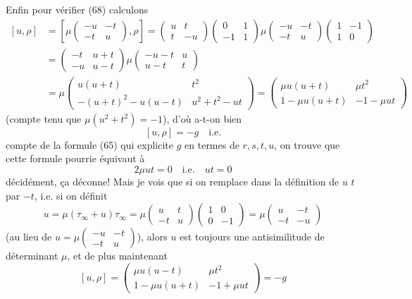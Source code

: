 \begin{enumerate}
Enfin pour vérifier (68) calculons
$$
\begin{aligned}
[u, \rho] &= \left[ \mu \begin{pmatrix} -u & -t \\ -t & u \end{pmatrix} , \rho \right] = \begin{pmatrix} u & t \\ t & -u \end{pmatrix} \begin{pmatrix} 0 & 1 \\ -1 & 1 \end{pmatrix} \mu \begin{pmatrix} -u & -t \\ -t & u \end{pmatrix} \begin{pmatrix} 1 & -1 \\ 1 & 0 \end{pmatrix} \\
&= \begin{pmatrix} -t & u+t \\ -u & u-t \end{pmatrix} \mu \begin{pmatrix} -u-t & u \\ u-t & t \end{pmatrix} \\
&= \mu \begin{pmatrix} u(u+t) & t^2 \\ -(u+t)^2 - u(u-t) & u^2+t^2-ut \end{pmatrix} = \begin{pmatrix} \mu u(u+t) & \mu t^2 \\ 1-\mu u(u+t) & -1-\mu ut \end{pmatrix}
\end{aligned}
$$
(compte tenu que $\mu(u^2+t^2) = -1$), d'où a-t-on bien
$$ [u, \rho] = -g \quad \text{i.e.} $$
compte de la formule (65) qui explicite $g$ en
termes de $r,s,t,u$, on trouve que cette formule
pourrie équivaut à
$$ 2\mu ut = 0 \quad \text{i.e.} \quad ut = 0 $$
décidément, ça déconne! Mais je vois que si on
remplace dans la définition de $u$ $t$ par $-t$,
i.e. si on définit
$$ u = \mu (\tau_\infty + u)\tau_\infty = \mu \begin{pmatrix} u & t \\ -t & u \end{pmatrix} \begin{pmatrix} 1 & 0 \\ 0 & -1 \end{pmatrix} = \mu \begin{pmatrix} u & -t \\ -t & -u \end{pmatrix} $$
(au lieu de $u = \mu \begin{pmatrix} -u & -t \\ -t & u \end{pmatrix}$), alors $u$ est toujours
une antisimilitude de déterminant $\mu$, et de
plus maintenant
$$ [u, \rho] = \begin{pmatrix} \mu u(u-t) & \mu t^2 \\ 1-\mu u(u+t) & -1+\mu ut \end{pmatrix} = -g $$


\end{enumerate}
